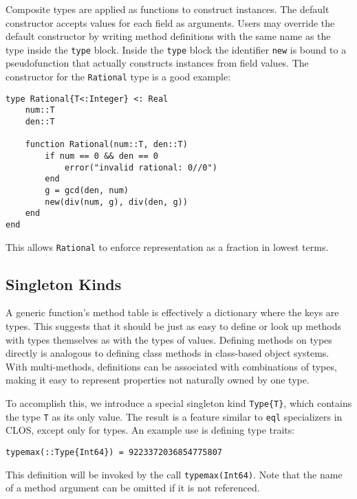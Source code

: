 \documentclass[9pt]{sigplanconf}
\begin{document}
Composite types are applied as functions to construct instances.
The default constructor accepts values for each field as arguments.
Users may override the default constructor by writing method definitions
with the same name as the type inside the {\tt type} block. Inside the
{\tt type} block the identifier {\tt new} is bound to a pseudofunction
that actually constructs instances from field values. The constructor
for the {\tt Rational} type is a good example:

\begin{verbatim}
type Rational{T<:Integer} <: Real
    num::T
    den::T

    function Rational(num::T, den::T)
        if num == 0 && den == 0
            error("invalid rational: 0//0")
        end
        g = gcd(den, num)
        new(div(num, g), div(den, g))
    end
end
\end{verbatim}

This allows {\tt Rational} to enforce representation as a fraction in
lowest terms.

\subsection{Singleton Kinds}

A generic function's method table is effectively a dictionary where the keys
are types. This suggests that it should be just as easy to define or look up
methods with types themselves as with the types of values. Defining methods on
types directly is analogous to defining class methods in class-based object
systems. With multi-methods, definitions can be associated with combinations
of types, making it easy to represent properties not naturally owned by one
type.

To accomplish this, we introduce a special singleton kind {\tt Type\{T\}},
which contains the type {\tt T} as its only value.
The result is a feature similar to {\tt eql}
specializers in CLOS, except only for types. An example use is defining
type traits:

\begin{verbatim}
typemax(::Type{Int64}) = 9223372036854775807
\end{verbatim}

This definition will be invoked by the call {\tt typemax(Int64)}. Note that
the name of a method argument can be omitted if it is not referenced.
\end{document}
